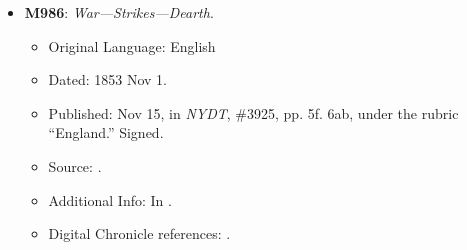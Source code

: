 \begin{itemize}


    \item \textbf{M986}: \textit{War—Strikes—Dearth}.
    \begin{itemize}
        \item Original Language: English
        \item Dated: 1853 Nov 1.
        \item Published: Nov 15, in \textit{NYDT}, \#3925, pp. 5f. 6ab, under the rubric ``England.'' Signed.
        \item Source: .
        \item Additional Info: In .
        \item Digital Chronicle references: .
    \end{itemize}


\end{itemize}
